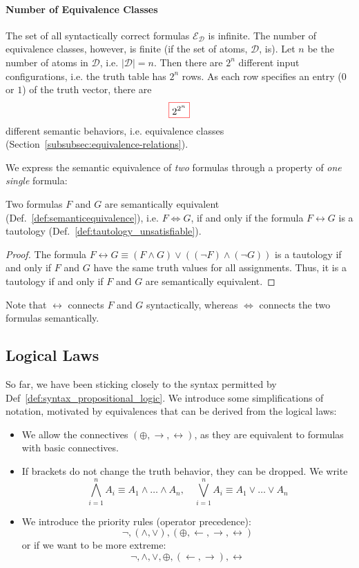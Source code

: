 \paragraph{Number of Equivalence Classes}
The set of all syntactically correct formulas \(\mathcal{E}_\mathcal{D}\) is infinite.
The number of equivalence classes, however, is finite (if the set of atoms, \(\mathcal{D}\), is).
Let \(n\) be the number of atoms in \(\mathcal{D}\), i.e. \(\lvert \mathcal{D} \rvert = n\).
Then there are \(2^n\) different input configurations, i.e. the truth table has \(2^n\) rows.
As each row specifies an entry (\(0\) or \(1\)) of the truth vector, there are 
\[
\fcolorbox{red}{white}{$\displaystyle
2^{2^n}
$}
\]
different semantic behaviors, i.e. equivalence classes (Section~\ref{subsubsec:equivalence-relations}).

We express the semantic equivalence of \emph{two} formulas through a property of \emph{one single} formula:
\begin{theorem}\label{thm:semantic_equivalence_tautology}
  Two formulas \(F\) and \(G\) are semantically equivalent (Def.~\ref{def:semanticequivalence}), i.e. \(F \Leftrightarrow G\), if and only if the formula \(F \leftrightarrow G\) is a tautology (Def.~\ref{def:tautology_unsatisfiable}).
\end{theorem}
\begin{proof}
  The formula \(F \leftrightarrow G \equiv (F \land G) \lor ((\neg F) \land (\neg G))\) is a tautology if and only if \(F\) and \(G\) have the same truth values for all assignments.
  Thus, it is a tautology if and only if \(F\) and \(G\) are semantically equivalent.
\end{proof}
Note that \(\leftrightarrow\) connects \(F\) and \(G\) syntactically, whereas \(\Leftrightarrow\) connects the two formulas semantically.

\subsection{Logical Laws}\label{subsec:logical_laws}

So far, we have been sticking closely to the syntax permitted by Def~\ref{def:syntax_propositional_logic}.
We introduce some simplifications of notation, motivated by equivalences that can be derived from the logical laws:
\begin{itemize}
\item We allow the connectives $(\oplus, \rightarrow, \leftrightarrow)$, as they are equivalent to formulas with basic connectives.
\item If brackets do not change the truth behavior, they can be dropped. We write
$$
\bigwedge_{i=1}^n A_i \equiv A_1 \wedge \ldots \wedge A_n, \quad \bigvee_{i=1}^n A_i \equiv A_1 \vee \ldots \vee A_n
$$
\item We introduce the priority rules (operator precedence):
\[
\neg, (\wedge, \vee), (\oplus, \leftarrow, \rightarrow, \leftrightarrow) 
\]
or if we want to be more extreme:
\[
\neg, \wedge, \vee, \oplus, (\leftarrow, \rightarrow), \leftrightarrow
\]
\end{itemize}

